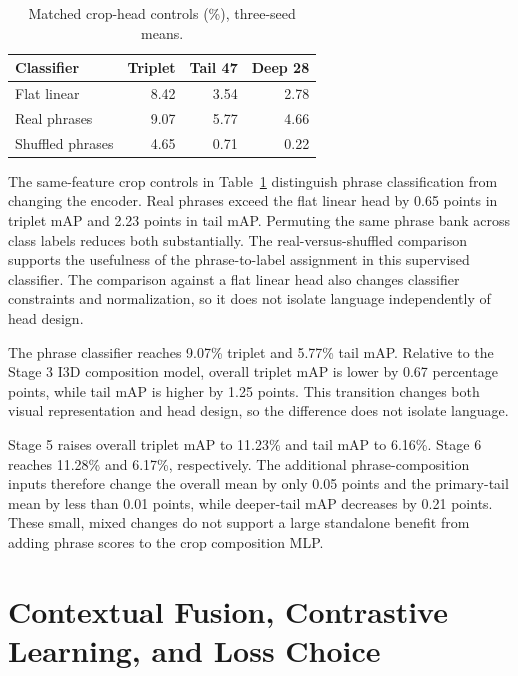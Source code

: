 \begin{table}[htbp]
\centering
\caption{Matched crop-head controls (\%), three-seed means.}
\label{tab:crop-controls}
\begin{singlespace}
\begin{tabularx}{\textwidth}{@{}Xrrr@{}}
\toprule
\textbf{Classifier} & \textbf{Triplet} & \textbf{Tail 47} & \textbf{Deep 28} \\
\midrule
Flat linear & 8.42 & 3.54 & 2.78 \\
Real phrases & 9.07 & 5.77 & 4.66 \\
Shuffled phrases & 4.65 & 0.71 & 0.22 \\
\bottomrule
\end{tabularx}
\end{singlespace}
\end{table}

The same-feature crop controls in Table~\ref{tab:crop-controls} distinguish phrase classification from changing the encoder. Real phrases exceed the flat linear head by 0.65 points in triplet mAP and 2.23 points in tail mAP. Permuting the same phrase bank across class labels reduces both substantially. The real-versus-shuffled comparison supports the usefulness of the phrase-to-label assignment in this supervised classifier. The comparison against a flat linear head also changes classifier constraints and normalization, so it does not isolate language independently of head design.

The phrase classifier reaches 9.07\% triplet and 5.77\% tail mAP. Relative to the Stage 3 I3D composition model, overall triplet mAP is lower by 0.67 percentage points, while tail mAP is higher by 1.25 points. This transition changes both visual representation and head design, so the difference does not isolate language.

Stage 5 raises overall triplet mAP to 11.23\% and tail mAP to 6.16\%. Stage 6 reaches 11.28\% and 6.17\%, respectively. The additional phrase-composition inputs therefore change the overall mean by only 0.05 points and the primary-tail mean by less than 0.01 points, while deeper-tail mAP decreases by 0.21 points. These small, mixed changes do not support a large standalone benefit from adding phrase scores to the crop composition MLP.

\section{Contextual Fusion, Contrastive Learning, and Loss Choice}

